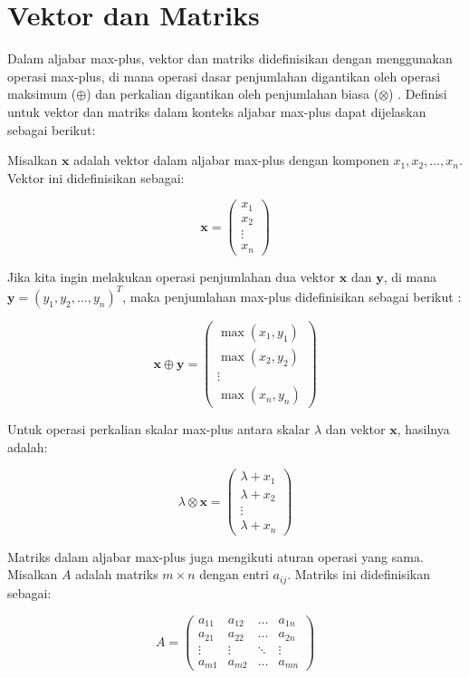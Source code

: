 \documentclass{file/TA-ITS}
\theoremstyle{definition}
\theoremstyle{definition}
\theoremstyle{plain}
\begin{document}
\section{Vektor dan Matriks}

\indent Dalam aljabar max-plus, vektor dan matriks didefinisikan dengan menggunakan operasi max-plus, di mana operasi dasar penjumlahan digantikan oleh operasi maksimum (\(\oplus\)) dan perkalian digantikan oleh penjumlahan biasa (\(\otimes\)) \cite{butkovic2010maxplus,heidergott,baccelli}. Definisi untuk vektor dan matriks dalam konteks aljabar max-plus dapat dijelaskan sebagai berikut:

Misalkan \( \mathbf{x} \) adalah vektor dalam aljabar max-plus dengan komponen \( x_1, x_2, \dots, x_n \). Vektor ini didefinisikan sebagai:

\[
\mathbf{x} = \begin{pmatrix} x_1 \\ x_2 \\ \vdots \\ x_n \end{pmatrix}
\]

Jika kita ingin melakukan operasi penjumlahan dua vektor \( \mathbf{x} \) dan \( \mathbf{y} \), di mana \( \mathbf{y} = (y_1, y_2, \dots, y_n)^T \), maka penjumlahan max-plus didefinisikan sebagai berikut \cite{cassandras}:

\[
\mathbf{x} \oplus \mathbf{y} = \begin{pmatrix} \max(x_1, y_1) \\ \max(x_2, y_2) \\ \vdots \\ \max(x_n, y_n) \end{pmatrix}
\]

Untuk operasi perkalian skalar max-plus antara skalar \( \lambda \) dan vektor \( \mathbf{x} \), hasilnya adalah:

\[
\lambda \otimes \mathbf{x} = \begin{pmatrix} \lambda + x_1 \\ \lambda + x_2 \\ \vdots \\ \lambda + x_n \end{pmatrix}
\]

Matriks dalam aljabar max-plus juga mengikuti aturan operasi yang sama. Misalkan \( A \) adalah matriks \( m \times n \) dengan entri \( a_{ij} \). Matriks ini didefinisikan sebagai:

\[
A = \begin{pmatrix} a_{11} & a_{12} & \dots & a_{1n} \\ a_{21} & a_{22} & \dots & a_{2n} \\ \vdots & \vdots & \ddots & \vdots \\ a_{m1} & a_{m2} & \dots & a_{mn} \end{pmatrix}
\]
\end{document}
